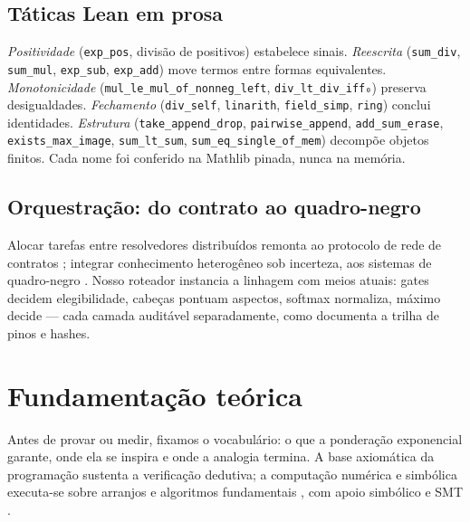 \documentclass[12pt,openany,oneside,a4paper,brazil,chapter=TITLE]{abntex2}
\let\cite\citep
\begin{document}
\section{Táticas Lean em prosa}
\textit{Positividade} (\texttt{exp\_pos}, divisão de positivos) estabelece sinais. \textit{Reescrita} (\texttt{sum\_div}, \texttt{sum\_mul}, \texttt{exp\_sub}, \texttt{exp\_add}) move termos entre formas equivalentes. \textit{Monotonicidade} (\nolinkurl{mul_le_mul_of_nonneg_left}, \texttt{div\_lt\_div\_iff₀}) preserva desigualdades. \textit{Fechamento} (\texttt{div\_self}, \texttt{linarith}, \texttt{field\_simp}, \texttt{ring}) conclui identidades. \textit{Estrutura} (\texttt{take\_append\_drop}, \texttt{pairwise\_append}, \texttt{add\_sum\_erase}, \texttt{exists\_max\_image}, \texttt{sum\_lt\_sum}, \texttt{sum\_eq\_single\_of\_mem}) decompõe objetos finitos. Cada nome foi conferido na Mathlib pinada, nunca na memória.
\section{Orquestração: do contrato ao quadro-negro}
Alocar tarefas entre resolvedores distribuídos remonta ao protocolo de rede de contratos \cite{smith1980}; integrar conhecimento heterogêneo sob incerteza, aos sistemas de quadro-negro \cite{erman1980}. Nosso roteador instancia a linhagem com meios atuais: gates decidem elegibilidade, cabeças pontuam aspectos, softmax normaliza, máximo decide --- cada camada auditável separadamente, como documenta a trilha de pinos e hashes.



\chapter{Fundamentação teórica}\label{cap:fundamentacao}
Antes de provar ou medir, fixamos o vocabulário: o que a ponderação exponencial garante, onde ela se inspira e onde a analogia termina. A base axiomática da programação \cite{hoare1969} sustenta a verificação dedutiva; a computação numérica e simbólica executa-se sobre arranjos e algoritmos fundamentais \cite{harris2020,virtanen2020}, com apoio simbólico e SMT \cite{meurer2017,demoura2008}.
\end{document}
